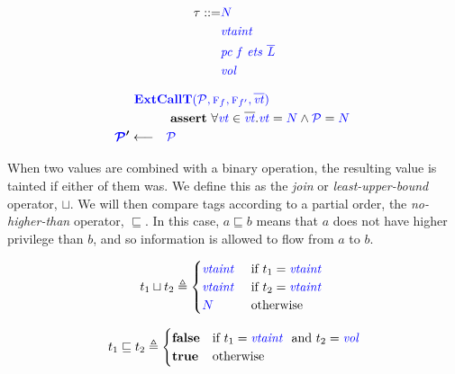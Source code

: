 \documentclass{llncs}
\begin{document}
\begin{minipage}{0.25\textwidth}
{ \color{blue}
  \begin{align*}
    \tau ::= & {\color{blue} N} \\
    & \mathit{\color{blue} vtaint ~ } \\
    & \mathit{\color{blue} pc ~ f ~ ets ~ \overline{L}} \\
    & \mathit{\color{blue} vol} \\
\end{align*} }
\end{minipage}
\begin{minipage}{0.74\textwidth}
\[\begin{aligned}
\truledef{\extcallt}
\assert{\forall \vt \in \overline{\vt} . \vt = \N \land \PCT = \N}
\settag{\PCT'}{\PCT}
\end{aligned}\]
\end{minipage}

When two values are combined with a binary operation, the resulting value is tainted
if either of them was. We define this as the {\em join} or {\em least-upper-bound}
operator, \(\sqcup\). We will then compare tags according to a partial order, the
{\em no-higher-than} operator, \(\sqsubseteq\). In this case, \(a \sqsubseteq b\)
means that \(a\) does not have higher privilege than \(b\), and so information is
allowed to flow from \(a\) to \(b\).

\begin{minipage}[t]{.49\textwidth}
\[t_1 \sqcup t_2 \triangleq
\begin{cases}
  \mathit{\color{blue} vtaint ~ } & \textnormal{if } t_1 = \mathit{\color{blue} vtaint ~ } \\
  \mathit{\color{blue} vtaint ~ } & \textnormal{if } t_2 = \mathit{\color{blue} vtaint ~ } \\
  {\color{blue} N} & \textnormal{otherwise} \\
\end{cases}\]
\end{minipage}
\begin{minipage}[t]{.49\textwidth}
\[t_1 \sqsubseteq t_2 \triangleq
\begin{cases}
  \mathbf{false} & \textnormal{if } t_1 = \mathit{\color{blue} vtaint ~ } \textnormal{ and } t_2 = \mathit{\color{blue} vol} \\
  \mathbf{true} & \textnormal{otherwise} \\
\end{cases}\]
\end{minipage}
\end{document}
